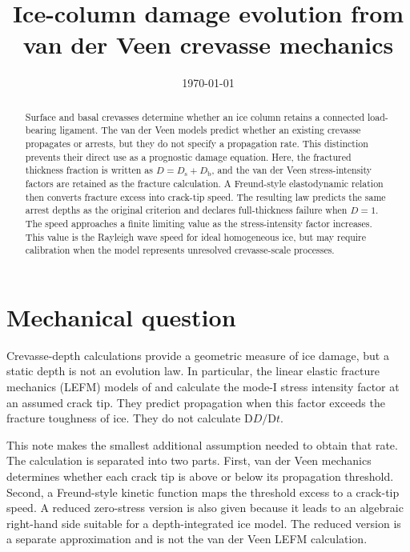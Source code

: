 \documentclass[11pt]{article}
\title{Ice-column damage evolution from van der Veen crevasse mechanics}
\author{}
\date{\today}
\newcommand{\rms}{\mathrm{s}}
\newcommand{\rmb}{\mathrm{b}}
\begin{document}
\maketitle

\begin{abstract}
Surface and basal crevasses determine whether an ice column retains a
connected load-bearing ligament.  The van der Veen models predict whether an
existing crevasse propagates or arrests, but they do not specify a propagation
rate.  This distinction prevents their direct use as a prognostic damage
equation.  Here, the fractured thickness fraction is written as
\(D=D_{\rms}+D_{\rmb}\), and the van der Veen stress-intensity factors are
retained as the fracture calculation.  A Freund-style elastodynamic relation
then converts fracture excess into crack-tip speed.  The resulting law
predicts the same arrest depths as the original criterion and declares
full-thickness failure when \(D=1\).  The speed approaches a finite limiting
value as the stress-intensity factor increases.  This value is the Rayleigh
wave speed for ideal homogeneous ice, but may require calibration when the
model represents unresolved crevasse-scale processes.
\end{abstract}

\section{Mechanical question}

Crevasse-depth calculations provide a geometric measure of ice damage, but a
static depth is not an evolution law.  In particular, the linear elastic
fracture mechanics (LEFM) models of \citet{vanderveen1998surface} and
\citet{vanderveen1998bottom} calculate the mode-I stress intensity factor at
an assumed crack tip.  They predict propagation when this factor exceeds the
fracture toughness of ice.  They do not calculate
\(\mathrm{D}D/\mathrm{D}t\).

This note makes the smallest additional assumption needed to obtain that rate.
The calculation is separated into two parts.  First, van der Veen mechanics
determines whether each crack tip is above or below its propagation threshold.
Second, a Freund-style kinetic function maps the threshold excess to a
crack-tip speed.  A reduced zero-stress version is also given because it leads
to an algebraic right-hand side suitable for a depth-integrated ice model.
The reduced version is a separate approximation and is not the van der Veen
LEFM calculation.
\end{document}
